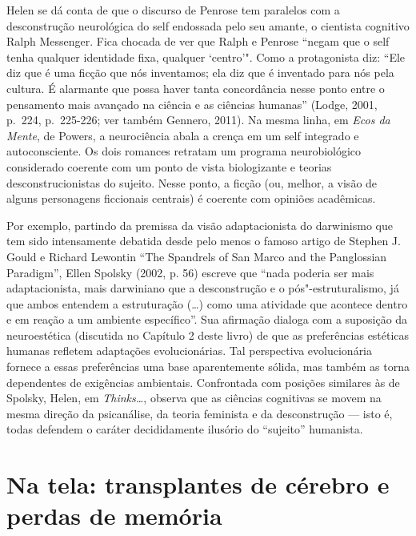 Helen se dá conta de que o discurso de Penrose tem paralelos com a
desconstrução neurológica do self endossada pelo seu amante, o cientista
cognitivo Ralph Messenger. Fica chocada de ver que Ralph e Penrose
``negam que o self tenha qualquer identidade fixa, qualquer `centro'".
Como a protagonista diz: ``Ele diz que é uma ficção que nós inventamos;
ela diz que é inventado para nós pela cultura. É alarmante que possa
haver tanta concordância nesse ponto entre o pensamento mais avançado na
ciência e as ciências humanas'' (Lodge, 2001, p.~224, p.~225-226; ver
também Gennero, 2011). Na mesma linha, em \emph{Ecos da Mente}, de
Powers, a neurociência abala a crença em um self integrado e
autoconsciente. Os dois romances retratam um programa neurobiológico
considerado coerente com um ponto de vista biologizante e teorias
desconstrucionistas do sujeito. Nesse ponto, a ficção (ou, melhor, a
visão de alguns personagens ficcionais centrais) é coerente com opiniões
acadêmicas.

Por exemplo, partindo da premissa da visão adaptacionista do darwinismo
que tem sido intensamente debatida desde pelo menos o famoso artigo de
Stephen J. Gould e Richard Lewontin ``The Spandrels of San Marco and the
Panglossian Paradigm'', Ellen Spolsky (2002, p. 56) escreve que ``nada
poderia ser mais adaptacionista, mais darwiniano que a desconstrução e o
pós"-estruturalismo, já que ambos entendem a estruturação (\ldots{}) como uma
atividade que acontece dentro e em reação a um ambiente específico''.
Sua afirmação dialoga com a suposição da neuroestética (discutida no
Capítulo 2 deste livro) de que as preferências estéticas humanas
refletem adaptações evolucionárias. Tal perspectiva evolucionária
fornece a essas preferências uma base aparentemente sólida, mas também
as torna dependentes de exigências ambientais. Confrontada com posições
similares às de Spolsky, Helen, em \emph{Thinks\ldots{}}, observa que as
ciências cognitivas se movem na mesma direção da psicanálise, da teoria
feminista e da desconstrução --- isto é, todas defendem o caráter
decididamente ilusório do ``sujeito'' humanista.

\section{Na tela: transplantes de cérebro e perdas de memória}


